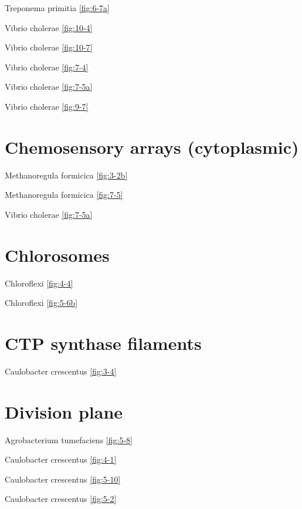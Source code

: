 \documentclass[]{tufte-book}
\begin{document}
Treponema primitia \ref{fig:6-7a}

Vibrio cholerae \ref{fig:10-4}

Vibrio cholerae \ref{fig:10-7}

Vibrio cholerae \ref{fig:7-4}

Vibrio cholerae \ref{fig:7-5a}

Vibrio cholerae \ref{fig:9-7}

\hypertarget{chemosensory-arrays-cytoplasmic}{%
\section*{Chemosensory arrays (cytoplasmic)}\label{chemosensory-arrays-cytoplasmic}}

Methanoregula formicica \ref{fig:3-2b}

Methanoregula formicica \ref{fig:7-5}

Vibrio cholerae \ref{fig:7-5a}

\hypertarget{chlorosomes-1}{%
\section*{Chlorosomes}\label{chlorosomes-1}}

Chloroflexi \ref{fig:4-4}

Chloroflexi \ref{fig:5-6b}

\hypertarget{ctp-synthase-filaments}{%
\section*{CTP synthase filaments}\label{ctp-synthase-filaments}}

Caulobacter crescentus \ref{fig:3-4}

\hypertarget{division-plane}{%
\section*{Division plane}\label{division-plane}}

Agrobacterium tumefaciens \ref{fig:5-8}

Caulobacter crescentus \ref{fig:4-1}

Caulobacter crescentus \ref{fig:5-10}

Caulobacter crescentus \ref{fig:5-2}
\end{document}

